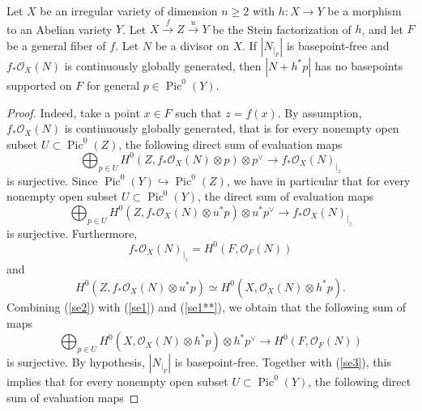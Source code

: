 \documentclass[10pt,a4paper]{amsart}
\begin{document}
\begin{lemma}\label{lemma1}
Let $X$ be an irregular variety of dimension $n\geq 2$ with $h:X \to Y$ be a morphism to an Abelian variety $Y$. Let $X \xrightarrow{f} Z \xrightarrow{u} Y$ be the Stein factorization of $h$, and let $F$ be a general fiber of $f$. Let $N$ be a divisor on $X$. If $|N_{|_{F}}|$ is basepoint-free and $f_{*}\mathcal{O}_{X}(N)$ is continuously globally generated, then $|N + h^{*}p|$ has no basepoints supported on $F$ for general $p \in \operatorname{Pic}^{0}(Y)$.
\end{lemma}

\begin{proof} Indeed, take a point $x\in F$ such that $z =f(x)$. By assumption, $f_{*}\mathcal{O}_{X}(N)$ is continuously globally generated, that is
for every nonempty open subset $U \subset \operatorname{Pic}^{0}(Z)$, the following direct sum of evaluation maps 
\begin{equation}\label{se1*}
\bigoplus_{p \in U} H^{0}(Z, f_{*}\mathcal{O}_{X}(N)\otimes p) \otimes p^{\vee} \to f_{*}\mathcal{O}_{X}(N)_{|_{z}}
\end{equation}
is surjective. Since $\operatorname{Pic}^{0}(Y) \hookrightarrow \operatorname{Pic}^{0}(Z)$, we have in particular that for every nonempty open subset $U \subset \operatorname{Pic}^{0}(Y)$, the direct sum of evaluation maps
\begin{equation}\label{se1**}
\bigoplus_{p \in U} H^{0}(Z, f_{*}\mathcal{O}_{X}(N)\otimes u^{*}p) \otimes u^{*}p^{\vee} \to f_{*}\mathcal{O}_{X}(N)_{|_{z}}
\end{equation}
is surjective. Furthermore,  \begin{equation}\label{se1}
f_{*}\mathcal{O}_{X}(N)_{|_{z}} = H^{0}(F, \mathcal{O}_{F}(N)) 
\end{equation}
and 
\begin{equation}\label{se2}
H^{0}(Z, f_{*}\mathcal{O}_{X}(N)\otimes u^{*}p) \simeq H^{0}(X, \mathcal{O}_{X}(N) \otimes h^{*}p).
\end{equation}
Combining (\ref{se2}) with (\ref{se1}) and (\ref{se1**}), we obtain that the following sum of maps
\begin{equation}\label{se3}
\bigoplus_{p \in U} H^{0}(X, \mathcal{O}_{X}(N) \otimes h^{*}p) \otimes h^{*}p^{\vee} \to H^{0}(F, \mathcal{O}_{F}(N))
\end{equation}
is surjective. By hypothesis, $|N_{|_{F}}|$ is basepoint-free. Together with (\ref{se3}), this implies that for every nonempty open subset $U \subset \operatorname{Pic}^{0}(Y)$, the following direct sum of evaluation maps

\end{proof}
\end{document}
